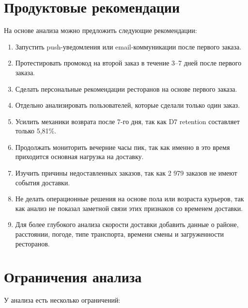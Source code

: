 \documentclass[12pt,a4paper]{article}
\begin{document}
\section{Продуктовые рекомендации}

На основе анализа можно предложить следующие рекомендации:

\begin{enumerate}
    \item Запустить push-уведомления или email-коммуникации после первого заказа.
    \item Протестировать промокод на второй заказ в течение 3--7 дней после первого заказа.
    \item Сделать персональные рекомендации ресторанов на основе первого заказа.
    \item Отдельно анализировать пользователей, которые сделали только один заказ.
    \item Усилить механики возврата после 7-го дня, так как D7 retention составляет только 5,81\%.
    \item Продолжать мониторить вечерние часы пик, так как именно в это время приходится основная нагрузка на доставку.
    \item Изучить причины недоставленных заказов, так как 2 979 заказов не имеют события доставки.
    \item Не делать операционные решения на основе пола или возраста курьеров, так как анализ не показал заметной связи этих признаков со временем доставки.
    \item Для более глубокого анализа скорости доставки добавить данные о районе, расстоянии, погоде, типе транспорта, времени смены и загруженности ресторанов.
\end{enumerate}

\newpage
\section{Ограничения анализа}

У анализа есть несколько ограничений:
\end{document}
